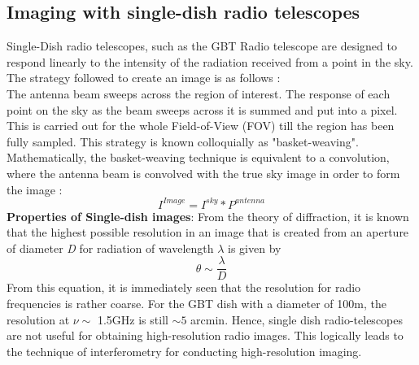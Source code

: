 \documentclass[twocolumn]{aastex61}
\begin{document}
\subsection{Imaging with single-dish radio telescopes}
Single-Dish radio telescopes, such as the GBT Radio telescope are designed to
respond linearly to the intensity of the radiation received from a point in the sky. The strategy followed to create
an image is as follows :\\
The antenna beam sweeps across the region of interest. The response of each point on the sky as the beam sweeps
across it is summed and put into a pixel. This is carried out for the whole Field-of-View (FOV) till the region has
been fully sampled. This strategy is known colloquially as "basket-weaving".
Mathematically, the basket-weaving technique is equivalent to a convolution, where the antenna beam is convolved with the true sky image in order to form the image :
\begin{equation}
I^{Image} = I^{sky} * P^{antenna}
\end{equation}
\textbf{Properties of Single-dish images}:
From the theory of diffraction, it is known %
 that the highest possible resolution in an image  that is created from an aperture of diameter \textit{D} for radiation of wavelength $\lambda$ is given by 
\begin{equation}
\theta \sim \frac{\lambda}{D}
\end{equation} 
From this equation, it is immediately seen that the resolution for radio frequencies is rather coarse. For the GBT dish with a diameter of 100m, the resolution at $\nu\sim$ 1.5GHz is still $\sim5$ arcmin. Hence, single dish radio-telescopes are not useful for obtaining high-resolution radio images. This logically leads to the technique of interferometry for conducting high-resolution imaging.
\end{document}
